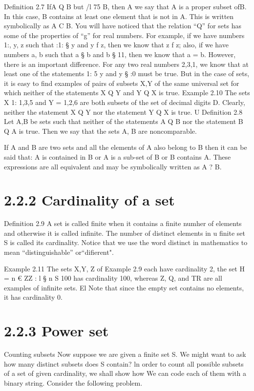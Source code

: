 {{{{Deﬁnition 2.7 IfA Q B but /l 75 B, then A we say that A is a proper subset ofB. In this case,
B contains at least one element that is not in A. This is written symbolically as A C B.
You will have noticed that the relation “Q” for sets has some of the properties of “g” for real
numbers. For example, if we have numbers 1:, y, z such that :1: § y and y f z, then we know that
z f z; also, if we have numbers a, b such that a § b and b § 11, then we know that a = b. However,
there is an important difference. 
\smallskip 
\smallskip 
For any two real numbers 2,3,1, we know that at least one of the
statements 1: 5 y and y § :0 must be true. But in the case of sets, it is easy to ﬁnd examples of
pairs of subsets X,Y of the same universal set for which neither of the statements X Q Y and
Y Q X is true.
\smallskip 
\smallskip 
Example 2.10 The sets X 1: {1,3,5} and Y = {1,2,6} are both subsets of the set of decimal
digits D. Clearly, neither the statement X Q Y nor the statement Y Q X is true. U
Deﬁnition 2.8 Let A,B be sets such that neither of the statements A Q B nor the statement
B Q A is true. Then we say that the sets A, B are noncomparable.
\smallskip 
\smallskip 

If A and B are two sets and all the elements of A also belong to B then it
can be said that:
A is contained in B
or A is a sub-set of B
or B contains A.
These expressions are all equivalent and may be symbolically written as
A ? B.
\smallskip 
\section{2.2.2 Cardinality of a set}
Deﬁnition 2.9 A set is called finite when it contains a finite numher of elements and otherwise
it is called inﬁnite. The number of distinct elements in u ﬁnite set S is called its cardinality.
Notice that we use the word distinct in mathematics to mean “distinguishable” or“diﬁerent".

\smallskip 
Example 2.11 The sets X,Y, Z of Example 2.9 each have cardinality 2, the set H = {n € ZZ : l §
n S 100} has cardinality 100, whereas Z, Q, and TR are all examples of inﬁnite sets. El
Note that since the empty set contains no elements, it has cardinality 0.
\section{2.2.3 Power set}
Counting subsets
Now suppose we are given a ﬁnite set S. We might want to ask how many distinct subsets does S
contain? ln order to count all possible subsets of a set of given cardinality, we shall show how We
can code each of them with a binary string. Consider the following problem.

}}}}
